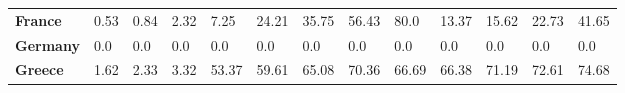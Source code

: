\begin{table}[H]
{\begin{tabular}{lllllllllllll}
            \textbf{France}                                    &
            0.53                                               &
            0.84                                               &
            2.32                                               &
            7.25                                               &
            24.21                                              &
            35.75                                              &
            56.43                                              &
            80.0                                               &
            13.37                                              &
            15.62                                              &
            22.73                                              &
            41.65                                                \\
            \textbf{Germany}                                   &
            0.0                                                &
            0.0                                                &
            0.0                                                &
            0.0                                                &
            0.0                                                &
            0.0                                                &
            0.0                                                &
            0.0                                                &
            0.0                                                &
            0.0                                                &
            0.0                                                &
            0.0                                                  \\
            \textbf{Greece}                                    &
            1.62                                               &
            2.33                                               &
            3.32                                               &
            53.37                                              &
            59.61                                              &
            65.08                                              &
            70.36                                              &
            66.69                                              &
            66.38                                              &
            71.19                                              &
            72.61                                              &
            74.68                                                \\

\end{tabular}}
\end{table}
